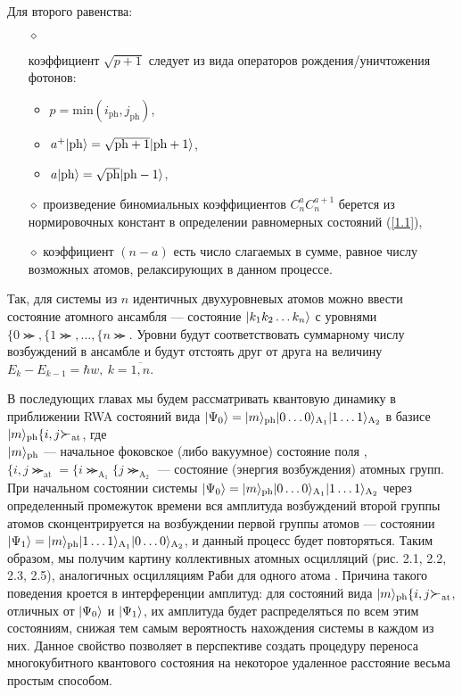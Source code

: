 Для второго равенства:
\begin{itemize}
	\item[$\diamond$]{
		коэффициент $\sqrt{p+1}$ следует из вида операторов рождения/уничтожения фотонов: 
		\begin{itemize}
			\item{$p = \mathrm{min}(i_{\mathrm{ph}}, j_{\mathrm{ph}})$,}
			\item{$a^{+}|\mathrm{ph}\rangle = \sqrt{\mathrm{ph} + 1}|\mathrm{ph} + 1\rangle$,}
			\item{$a|\mathrm{ph}\rangle = \sqrt{\mathrm{ph}}|\mathrm{ph-1}\rangle$,}
		\end{itemize}
	}
	\item[$\diamond$]{ 
		произведение биномиальных коэффициентов $C_{n}^{a}C_{n}^{a+1}$ берется из нормировочных констант в определении 	равномерных состояний (\ref{1.1})},
	\item[$\diamond$]{
		коэффициент $(n-a)$ есть число слагаемых в сумме, равное числу возможных атомов, релаксирующих в данном процессе.}
\end{itemize}

Так, для системы из $n$ идентичных двухуровневых атомов можно ввести состояние атомного ансамбля --- состояние $|k_{1}k_{2}\dots k_{n}\rangle$ с уровнями $\{0\Succ, \{1\Succ, \dots, \{n\Succ$. Уровни будут соответствовать суммарному числу возбуждений в ансамбле и будут отстоять друг от друга на величину $E_{k} - E_{k-1} = \hbar w,\ k = \overline{1,n}$.

В последующих главах мы будем рассматривать квантовую динамику в приближении RWA \cite{ozhigov_qq, rwa_1, rwa_2} состояний вида $|\Psi_0\rangle=|m\rangle_{\mathrm{ph}}|0\dots0\rangle_{\mathrm{A_{1}}} |1\dots1\rangle_{\mathrm{A_{2}}}$ в базисе $|m\ra_{\mathrm{ph}}\{i,j\Succ_{\mathrm{at}}$, где
\\
\null\qquad$|m\rangle_{\mathrm{ph}}$ --- начальное фоковское (либо вакуумное) состояние поля \cite{landau,belousov,messia},
\\[6pt]
\null\qquad$\{i,j\Succ_{\mathrm{at}}\!=\!\{i\Succ_{\mathrm{A_{1}}}\{j\Succ_{\mathrm{A_{2}}}$ --- состояние (энергия возбуждения) атомных групп.
\
\\[0pt]
\indent При начальном состоянии системы $|\Psi_0\rangle=|m\rangle_{\mathrm{ph}}|0\dots0\rangle_{\mathrm{A_{1}}} |1\dots1\rangle_{\mathrm{A_{2}}}$ через определенный промежуток времени вся амплитуда возбуждений второй группы атомов сконцентрируется на возбуждении первой группы атомов --- состоянии $|\Psi_1\rangle=|m\rangle_{\mathrm{ph}}|1\dots1\rangle_{\mathrm{A_{1}}} |0\dots0\rangle_{\mathrm{A_{2}}}$, и данный процесс будет повторяться. Таким образом, мы получим картину коллективных атомных осцилляций ({\color{red}рис. 2.1, 2.2, 2.3, 2.5}), аналогичных осцилляциям Раби для одного атома \cite{rabi_1,rabi_2,rabi_3,rabi_4}. Причина такого поведения кроется в интерференции амплитуд: для состояний вида $|m\ra_{\mathrm{ph}}\{i,j\Succ_{\mathrm{at}}$, отличных от $|\Psi_{0}\rangle$ и $|\Psi_{1}\rangle$, их амплитуда будет распределяться по всем этим состояниям, снижая тем самым вероятность нахождения системы в каждом из них. Данное свойство позволяет в перспективе создать процедуру переноса многокубитного квантового состояния на некоторое удаленное расстояние весьма простым способом.

